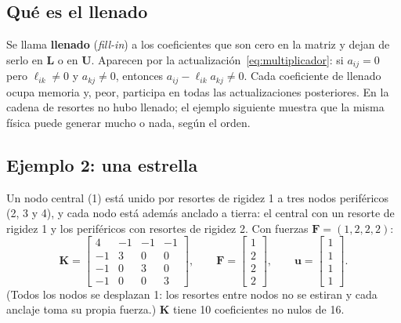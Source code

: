 \documentclass[11pt,a4paper]{article}
\newcommand{\mK}{\bm{K}}
\begin{document}
\subsection{Qué es el llenado}

Se llama \textbf{llenado} (\emph{fill-in}) a los coeficientes que son cero en la matriz y dejan de serlo en $\bm{L}$ o en $\bm{U}$. Aparecen por la actualización~\eqref{eq:multiplicador}: si $a_{ij}=0$ pero $\ell_{ik}\neq0$ y $a_{kj}\neq0$, entonces $a_{ij}-\ell_{ik}a_{kj}\neq0$. Cada coeficiente de llenado ocupa memoria y, peor, participa en todas las actualizaciones posteriores. En la cadena de resortes no hubo llenado; el ejemplo siguiente muestra que la misma física puede generar mucho o nada, según el orden.

\subsection{Ejemplo 2: una estrella}\label{sec:estrella}

Un nodo central (1) está unido por resortes de rigidez 1 a tres nodos periféricos (2, 3 y 4), y cada nodo está además anclado a tierra: el central con un resorte de rigidez 1 y los periféricos con resortes de rigidez 2. Con fuerzas $\bm{F}=(1,2,2,2)$:
\[
\mK=\begin{bmatrix}4&-1&-1&-1\\-1&3&0&0\\-1&0&3&0\\-1&0&0&3\end{bmatrix},\qquad
\bm{F}=\begin{bmatrix}1\\2\\2\\2\end{bmatrix},\qquad
\bm{u}=\begin{bmatrix}1\\1\\1\\1\end{bmatrix}.
\]
(Todos los nodos se desplazan 1: los resortes entre nodos no se estiran y cada anclaje toma su propia fuerza.) $\mK$ tiene 10 coeficientes no nulos de 16.
\end{document}
